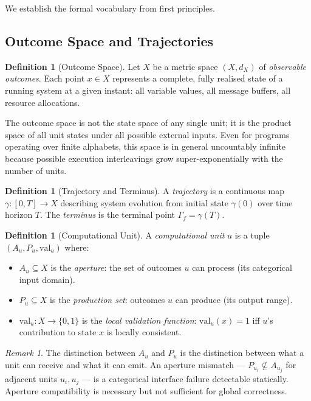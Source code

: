 \documentclass[twocolumn,a4paper,11pt]{article}
\theoremstyle{plain}
\theoremstyle{definition}
\newtheorem{definition}[theorem]{Definition}
\theoremstyle{remark}
\newtheorem{remark}[theorem]{Remark}
\begin{document}
We establish the formal vocabulary from first principles.

\subsection{Outcome Space and Trajectories}

\begin{definition}[Outcome Space]
\label{def:outcome-space}
Let $X$ be a metric space $(X, d_X)$ of \emph{observable outcomes}. Each
point $x \in X$ represents a complete, fully realised state of a running
system at a given instant: all variable values, all message buffers, all
resource allocations.
\end{definition}

The outcome space is not the state space of any single unit; it is the
product space of all unit states under all possible external inputs. Even
for programs operating over finite alphabets, this space is in general
uncountably infinite because possible execution interleavings grow
super-exponentially with the number of units.

\begin{definition}[Trajectory and Terminus]
\label{def:trajectory}
A \emph{trajectory} is a continuous map $\gamma: [0,T] \to X$ describing
system evolution from initial state $\gamma(0)$ over time horizon $T$.
The \emph{terminus} is the terminal point $\Gamma_f = \gamma(T)$.
\end{definition}

\begin{definition}[Computational Unit]
\label{def:unit}
A \emph{computational unit} $u$ is a tuple $(A_u, P_u, \mathrm{val}_u)$
where:
\begin{itemize}[leftmargin=*]
  \item $A_u \subseteq X$ is the \emph{aperture}: the set of outcomes $u$
        can process (its categorical input domain).
  \item $P_u \subseteq X$ is the \emph{production set}: outcomes $u$ can
        produce (its output range).
  \item $\mathrm{val}_u: X \to \{0,1\}$ is the \emph{local validation
        function}: $\mathrm{val}_u(x) = 1$ iff $u$'s contribution to
        state $x$ is locally consistent.
\end{itemize}
\end{definition}

\begin{remark}
The distinction between $A_u$ and $P_u$ is the distinction between what
a unit can receive and what it can emit. An aperture mismatch ---
$P_{u_i} \not\subseteq A_{u_j}$ for adjacent units $u_i, u_j$ --- is a
categorical interface failure detectable statically. Aperture compatibility
is necessary but not sufficient for global correctness.
\end{remark}
\end{document}
